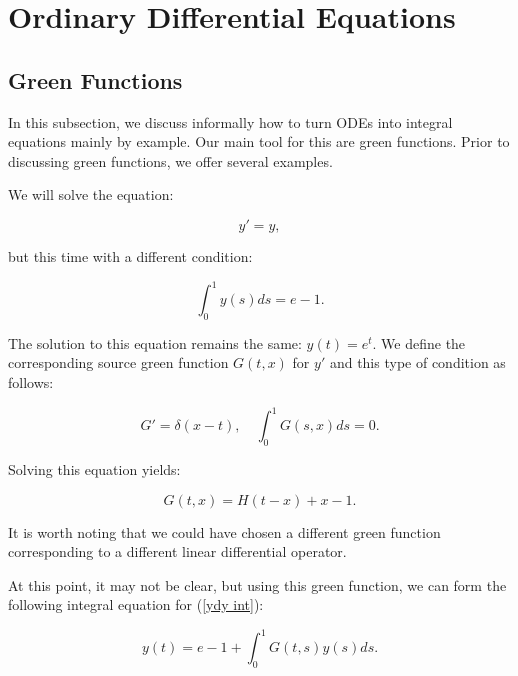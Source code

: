 \documentclass[a4paper,12pt]{article}
\begin{document}
\section{Ordinary Differential Equations}

\subsection{Green Functions}
In this subsection, we discuss informally how to turn ODEs into integral equations mainly
by example. Our main tool for this are green functions.
Prior to discussing green functions, we offer several
examples.

\begin{example}[$y'=y$ average condition]
    We will solve the equation:

    \begin{equation} \label{ydy int}
        y' = y,
    \end{equation}

    but this time with a different condition:

    \begin{equation}
        \int_{0}^{1} y(s) ds = e-1.
    \end{equation}

    The solution to this equation remains the same: $y(t) = e^{t}$.
    We define the corresponding source green function $G(t,x)$ for $y'$
    and this type of condition as follows:

    \begin{equation}
        G' = \delta(x-t), \quad \int_{0}^{1} G(s,x) ds = 0.
    \end{equation}

    Solving this equation yields:

    \begin{equation}
        G(t,x) = H(t-x) + x - 1.
    \end{equation}

    It is worth noting that we could have chosen a different
    green function corresponding to a different linear
    differential operator.

    At this point, it may not be clear, but using this green function,
    we can form the following integral equation for (\ref{ydy int}):

    \begin{equation} \label{int ydy int}
        y(t) = e - 1 + \int_{0}^{1} G(t,s) y(s) ds.
    \end{equation}


\end{example}
\end{document}
